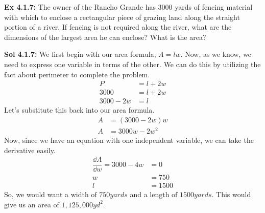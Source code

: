 \begin{tcolorbox}[example]
    \textbf{Ex 4.1.7: } The owner of the Rancho Grande has $3000$ yards of fencing material with which to enclose a rectangular piece of grazing land along the straight portion of a river. If fencing is not required along the river, what are the dimensions of the largest area he can enclose? What is the area? \par
    \vspace{11pt}
    \begin{center}
    \end{center}
\end{tcolorbox}
\begin{tcolorbox}[solution]
    \textbf{Sol 4.1.7: } We first begin with our area formula, $A = lw$. Now, as we know, we need to express one variable in terms of the other. We can do this by utilizing the fact about perimeter to complete the problem. \begin{align*}
        P &= l + 2w \\[11pt]
        3000 &= l + 2w \\[11pt]
        3000 - 2w &= l
    \end{align*} 
    Let's substitute this back into our area formula. \begin{align*}
        A &= (3000 - 2w)w \\[11pt]
        A &= 3000w - 2w^2
    \end{align*}
    Now, since we have an equation with one independent variable, we can take the derivative easily. \begin{align*}
        \dfrac{\dd A}{\dd w} = 3000 - 4w &= 0 \\[11pt]
        w &= 750 \\[11pt]
        l &= 1500
    \end{align*}
    So, we would want a $\boxed{\text{width of } 750 \si{yards}}$ and a $\boxed{\text{length of } 1500 \si{yards}}$. This would give us an area of $\boxed{1,125,000 \si{yd^2}}$.
\end{tcolorbox} \vspace{11pt}

